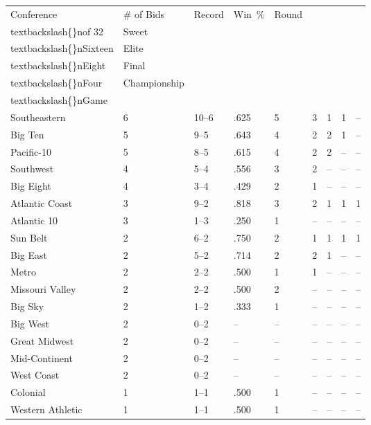 \documentclass{article}
\begin{document}
\begin{tabular}{lllllllll}
\toprule
Conference & \# of Bids & Record & Win \% & Round\\textbackslash\{\}nof 32 & Sweet\\textbackslash\{\}nSixteen & Elite\\textbackslash\{\}nEight & Final\\textbackslash\{\}nFour & Championship\\textbackslash\{\}nGame \\
\midrule
Southeastern & 6 & 10–6 & .625 & 5 & 3 & 1 & 1 & – \\
Big Ten & 5 & 9–5 & .643 & 4 & 2 & 2 & 1 & – \\
Pacific-10 & 5 & 8–5 & .615 & 4 & 2 & 2 & – & – \\
Southwest & 4 & 5–4 & .556 & 3 & 2 & – & – & – \\
Big Eight & 4 & 3–4 & .429 & 2 & 1 & – & – & – \\
Atlantic Coast & 3 & 9–2 & .818 & 3 & 2 & 1 & 1 & 1 \\
Atlantic 10 & 3 & 1–3 & .250 & 1 & – & – & – & – \\
Sun Belt & 2 & 6–2 & .750 & 2 & 1 & 1 & 1 & 1 \\
Big East & 2 & 5–2 & .714 & 2 & 2 & 1 & – & – \\
Metro & 2 & 2–2 & .500 & 1 & 1 & – & – & – \\
Missouri Valley & 2 & 2–2 & .500 & 2 & – & – & – & – \\
Big Sky & 2 & 1–2 & .333 & 1 & – & – & – & – \\
Big West & 2 & 0–2 & – & – & – & – & – & – \\
Great Midwest & 2 & 0–2 & – & – & – & – & – & – \\
Mid-Continent & 2 & 0–2 & – & – & – & – & – & – \\
West Coast & 2 & 0–2 & – & – & – & – & – & – \\
Colonial & 1 & 1–1 & .500 & 1 & – & – & – & – \\
Western Athletic & 1 & 1–1 & .500 & 1 & – & – & – & – \\
\bottomrule
\end{tabular}
\end{document}
